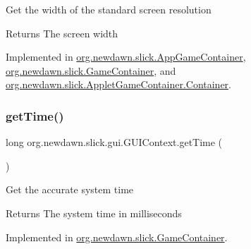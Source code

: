 Get the width of the standard screen resolution

\begin{DoxyReturn}{Returns}
The screen width 
\end{DoxyReturn}


Implemented in \mbox{\hyperlink{classorg_1_1newdawn_1_1slick_1_1_app_game_container_a48293caa27148b1a4dc0b77a047f89f3}{org.\+newdawn.\+slick.\+App\+Game\+Container}}, \mbox{\hyperlink{classorg_1_1newdawn_1_1slick_1_1_game_container_a4c84d852e74fa2eb0d1e05f924f5402b}{org.\+newdawn.\+slick.\+Game\+Container}}, and \mbox{\hyperlink{classorg_1_1newdawn_1_1slick_1_1_applet_game_container_1_1_container_abc0a573b767d1df3719c360678256ffc}{org.\+newdawn.\+slick.\+Applet\+Game\+Container.\+Container}}.

\mbox{\label{interfaceorg_1_1newdawn_1_1slick_1_1gui_1_1_g_u_i_context_a796c54a6f7d2337903afd68002dfeb0d}} 
\subsubsection{\texorpdfstring{get\+Time()}{getTime()}}
{\footnotesize\ttfamily long org.\+newdawn.\+slick.\+gui.\+G\+U\+I\+Context.\+get\+Time (\begin{DoxyParamCaption}{ }\end{DoxyParamCaption})}

Get the accurate system time

\begin{DoxyReturn}{Returns}
The system time in milliseconds 
\end{DoxyReturn}


Implemented in \mbox{\hyperlink{classorg_1_1newdawn_1_1slick_1_1_game_container_a1650b161216693ec0b4c0d9d00496c05}{org.\+newdawn.\+slick.\+Game\+Container}}.

\mbox{\label{interfaceorg_1_1newdawn_1_1slick_1_1gui_1_1_g_u_i_context_a013e06eaddd0d6872dc628ca171c6753}} 
